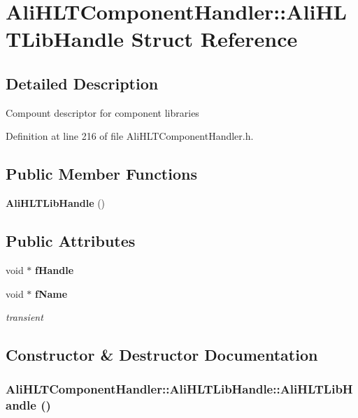 \section{Ali\-HLTComponent\-Handler::Ali\-HLTLib\-Handle Struct Reference}
\label{structAliHLTComponentHandler_1_1AliHLTLibHandle}


\subsection{Detailed Description}
Compount descriptor for component libraries 



Definition at line 216 of file Ali\-HLTComponent\-Handler.h.\subsection*{Public Member Functions}
\begin{CompactItemize}
\item 
{\bf Ali\-HLTLib\-Handle} ()
\end{CompactItemize}
\subsection*{Public Attributes}
\begin{CompactItemize}
\item 
void $\ast$ {\bf f\-Handle}
\item 
void $\ast$ {\bf f\-Name}
\begin{CompactList}\small\item\em transient \item\end{CompactList}\end{CompactItemize}


\subsection{Constructor \& Destructor Documentation}
\subsubsection{\setlength{\rightskip}{0pt plus 5cm}Ali\-HLTComponent\-Handler::Ali\-HLTLib\-Handle::Ali\-HLTLib\-Handle ()\hspace{0.3cm}{\tt  [inline]}}\label{structAliHLTComponentHandler_1_1AliHLTLibHandle_a0}




